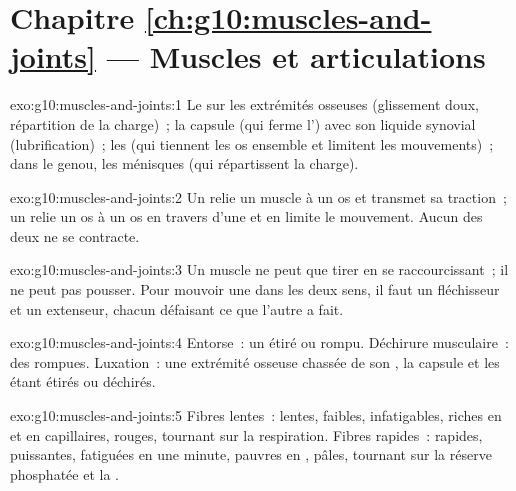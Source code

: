 \section*{Chapitre \ref{ch:g10:muscles-and-joints} --- Muscles et articulations}

\begin{solution}{exo:g10:muscles-and-joints:1}
Le  sur les extrémités osseuses (glissement doux, répartition
de la charge)~; la capsule (qui ferme l') avec son liquide
synovial (lubrification)~; les  (qui tiennent les os ensemble
et limitent les mouvements)~; dans le genou, les ménisques (qui
répartissent la charge).
\end{solution}

\begin{solution}{exo:g10:muscles-and-joints:2}
Un  relie un muscle à un os et transmet sa traction~; un 
relie un os à un os en travers d'une  et en limite le
mouvement. Aucun des deux ne se contracte.
\end{solution}

\begin{solution}{exo:g10:muscles-and-joints:3}
Un muscle ne peut que tirer en se raccourcissant~; il ne peut pas
pousser. Pour mouvoir une  dans les deux sens, il faut un
fléchisseur et un extenseur, chacun défaisant ce que l'autre a fait.
\end{solution}

\begin{solution}{exo:g10:muscles-and-joints:4}
Entorse~: un  étiré ou rompu. Déchirure musculaire~: des  rompues. Luxation~: une extrémité osseuse chassée de son
, la capsule et les  étant étirés ou déchirés.
\end{solution}

\begin{solution}{exo:g10:muscles-and-joints:5}
Fibres lentes~: lentes, faibles, infatigables, riches en 
et en capillaires, rouges, tournant sur la respiration. Fibres
rapides~: rapides, puissantes, fatiguées en une minute, pauvres en
, pâles, tournant sur la réserve phosphatée et la
.
\end{solution}

